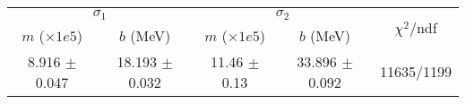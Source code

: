 \begin{tabular}{cc|cc||c}
\multicolumn{2}{c|}{$\sigma_1$} & \multicolumn{2}{|c}{$\sigma_2$} & \multirow{2}{*}{$\chi^2/$ndf} \\
$m$ ($\times1e5$) & $b$ (MeV) & $m$ ($\times1e5$) & $b$ (MeV) & \\
\hline
8.916 $\pm$ 0.047 & 18.193 $\pm$ 0.032 & 11.46 $\pm$ 0.13 & 33.896 $\pm$ 0.092 & 11635/1199\\
\end{tabular}
